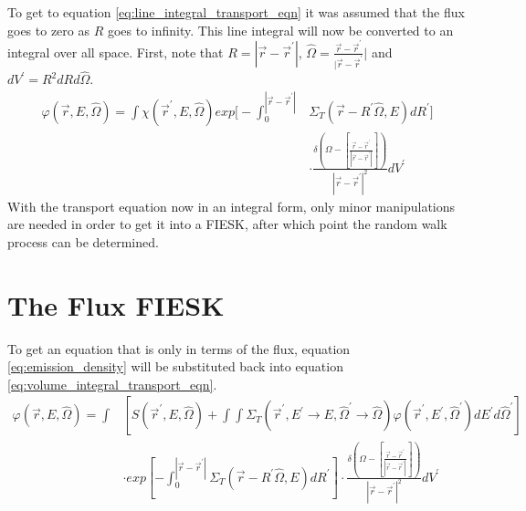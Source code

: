 To get to equation \ref{eq:line_integral_transport_eqn} it was assumed that the
flux goes to zero as $R$ goes to infinity. This line integral will now be 
converted to an integral over all space. First, note that 
$R = |\vec{r} - \vec{r}^{'}|$, 
$\hat{\Omega} = \frac{\vec{r} - \vec{r}^{'}}{|\vec{r} - \vec{r}^{'}}|$ and
$dV^{'} = R^2dRd\hat{\Omega}$.
\begin{equation}
  \begin{split}
    \varphi(\vec{r},E,\hat{\Omega}) = 
    \int \chi(\vec{r}^{'},E,\hat{\Omega})
    exp\Big[-\int_0^{|\vec{r} - \vec{r}^{'}|} 
      &\Sigma_T(\vec{r}-R^{'}\hat{\Omega},E)dR^{'} \Big] \\
    &\cdot \frac{\delta \left(\Omega - \left[\frac{\vec{r} - \vec{r}^{'}}
        {|\vec{r} - \vec{r}^{'}|}\right]\right)}
    {|\vec{r} - \vec{r}^{'}|^2} dV^{'}
  \end{split}
  \label{eq:volume_integral_transport_eqn}
\end{equation}
With the transport equation now in an integral form, only minor manipulations
are needed in order to get it into a FIESK, after which point the random walk 
process can be determined.

\section{The Flux FIESK}
To get an equation that is only in terms of the flux, equation 
\ref{eq:emission_density} will be substituted back into equation 
\ref{eq:volume_integral_transport_eqn}.
\begin{equation*}
  \begin{split}
    \varphi(\vec{r},E,\hat{\Omega}) = \int &\left[
    S(\vec{r}^{'},E,\hat{\Omega}) + 
    \int\int \Sigma_T(\vec{r}^{'},E^{'} \to E, \hat{\Omega}^{'} \to \hat{\Omega})
    \varphi(\vec{r}^{'},E^{'},\hat{\Omega}^{'})dE^{'}d\hat{\Omega}^{'} \right] \\
    & \cdot exp\left[-\int_0^{|\vec{r} - \vec{r}^{'}|} 
      \Sigma_T(\vec{r}-R^{'}\hat{\Omega},E)dR^{'} \right]
    \cdot \frac{\delta \left(\Omega - \left[\frac{\vec{r} - \vec{r}^{'}}
        {|\vec{r} - \vec{r}^{'}|}\right]\right)} 
    {|\vec{r} - \vec{r}^{'}|^2} dV^{'}
  \end{split}
\end{equation*}


